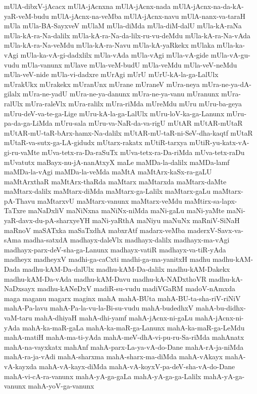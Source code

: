 {mUlA-dibxV-jAcacx
mUlA-jAcnxna
mUlA-jAcnx-nada
mUlA-jAcnx-na-da-kA-yaR-veM-budu
mUlA-jAcnx-na-veMba
mUlA-jAcnx-navu
mUlA-nanx-va-taraH
mUla
mUla-BA-SayxveV
mUlaM
mUla-diMda
mUla-diM-dalU
mUla-kA-raNa
mUla-kA-ra-Na-dalilx
mUla-kA-ra-Na-da-lilx-ru-vu-deMdu
mUla-kA-ra-Na-vAda
mUla-kA-ra-Na-veMdu
mUla-kA-ra-Navu
mUla-kA-yaRkekx
mUlaka
mUla-ka-vAgi
mUla-ka-vA-gi-dadxlilx
mUla-vAda
mUla-vAgi
mUla-vA-gide
mUla-vA-gu-vudu
mUla-vanunx
mUlave
mUla-veM-budU
mUla-veMdu
mUla-veV-neMdu
mUla-veV-nide
mUla-vi-dadxre
mUrAgi
mUrU
mUrU-kA-la-ga-LalUlx
mUrakUkx
mUrakekx
mUranUnx
mUrane
mUraneV
mUra-neya
mUra-ne-ya-dA-gilalx
mUra-ne-yadU
mUra-ne-ya-danunx
mUra-ne-ya-vanu
mUranunx
mUra-ralUlx
mUra-raleVlx
mUra-ralilx
mUra-riMda
mUreMdu
mUru
mUru-ba-geya
mUru-deV-va-te-ga-Lige
mUru-kA-la-ga-LalUlx
mUru-loV-ka-ga-Lanunx
mUru-pa-da-ga-LiMda
mUru-sala
mUru-va-NaR-da-va-rigU
mUtAR
mUtAR-mUtaR
mUtAR-mU-taR-bArx-hamx-Na-dalilx
mUtAR-mU-taR-ni-SeV-dha-kaqtf
mUtaR
mUtaR-va-sutx-ga-LA-gidudx
mUtarx-rakatx
mUtiR-tarxya
mUtiR-yu-katx-vA-gi-ru-vaMte
mUva-tetx-ra-Da-raSuTx
mUva-tetx-ra-Da-riMda
mUva-tetx-raDu
mUvatutx
maBayx-nu-jA-nanAtxyX
maLe
maMDa-la-dalilx
maMDa-lamf
maMDa-la-vAgi
maMDa-la-veMda
maMtA
maMtArx-kaSx-ra-gaLU
maMtArxthaR
maMtArx-thaRda
maMtarx
maMtarxda
maMtarx-daMte
maMtarx-dalilx
maMtarx-diMda
maMtarx-ga-Lalilx
maMtarx-gaLu
maMtarx-pA-Thavu
maMtarxvU
maMtarx-vanunx
maMtarx-veMdu
maMtirx-sa-lapx-TaTxre
maNaDxliV
maNiNxna
maNiNx-niMda
maNi-gaLu
maNi-yaMte
maNi-yaR-davx-du-pA-sharxyeYH
maNi-yaRthA
maNiyu
maNuNx
maRniV-SiNaH
maRnoV
maSATxka
maSaTxdhA
mabxrAtf
madarx-veMba
maderxV-Savx-va-sAma
madha-satxdA
madhayx-daleVlx
madhayx-dalilx
madhayx-ma-vAgi
madhayx-parx-deV-sha-ga-Lanunx
madhayx-vatiR
madhayx-va-tiR-yAda
madheyx
madheyxV
madhi-ga-caCxti
madhi-ga-ma-yanitxH
madhu
madhu-kAM-Dada
madhu-kAM-Da-dalUlx
madhu-kAM-Da-dalilx
madhu-kAM-Dakekx
madhu-kAM-Da-vAda
madhu-kAM-Davu
madhu-kA-NADxthoVR
madhu-kA-NaDxsayx
madhu-kANeDxV
madiR-su-vudu
madiVGaRM
madoV-nAmxda
maga
maganu
magarx
maginx
mahA
mahA-BUta
mahA-BU-ta-sha-riV-riNiV
mahA-Pa-lavu
mahA-Pa-la-vu-la-Bi-su-vudu
mahA-budedhxV
mahA-bu-didhx-vaM-taru
mahA-dhiyaH
mahA-dhi-yamf
mahA-jAcnx-ni-gaLu
mahA-jAcnx-ni-yAda
mahA-ka-maR-gaLa
mahA-ka-maR-ga-Lanunx
mahA-ka-maR-ga-LeMdu
mahA-matiH
mahA-ma-ti-yAda
mahA-meV-dhA-vi-pu-ru-Sa-riMda
mahAnatx
mahA-na-vayxkatx
mahAnf
mahA-parx-La-ya-vA-do-Dane
mahA-rA-ja-niMda
mahA-ra-ja-vAdi
mahA-sharxma
mahA-sharx-ma-diMda
mahA-vAkayx
mahA-vA-kayxda
mahA-vA-kayx-diMda
mahA-vA-koyxV-pa-deV-sha-vA-do-Dane
mahA-vi-cA-ra-vanunx
mahA-yA-ga-gaLa
mahA-yA-ga-ga-Lalilx
mahA-yA-ga-vanunx
mahA-yoV-ga-vanunx
}
